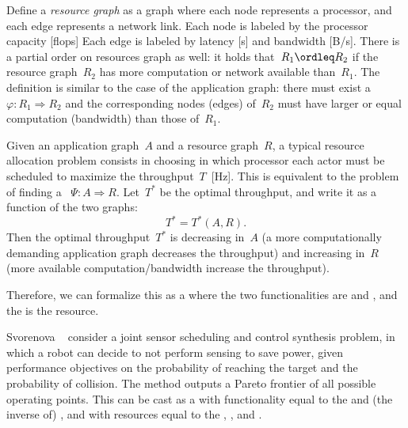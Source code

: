 Define a \emph{resource graph} as a graph where each node represents a processor, and each edge represents a network link.
Each node is labeled by the processor capacity [flops] Each edge is labeled by latency [s] and bandwidth [B/s].
There is a partial order on resources graph as well: it holds that~$R_1 \ordleq R_2$ if the resource graph~$R_2$ has more computation or network available than~$R_1$.
The definition is similar to the case of the application graph: there must exist a ~$\varphi \colon R_1 \Rightarrow R_2$
and the corresponding nodes (edges) of~$R_2$ must have larger or equal computation (bandwidth) than those of~$R_1$.

Given an application graph~$A$ and a resource graph~$R$, a typical resource allocation problem consists in choosing in which processor each actor must be scheduled to maximize the throughput~$T$~[Hz].
This is equivalent to the problem of finding a ~$\Psi \colon A \Rightarrow R$.
Let~$T^{\ast}$ be the optimal throughput, and write it as a function of the two graphs:
\begin{equation}
    T^{\ast}=T^{\ast}(A,R).
\end{equation}
Then the optimal throughput~$T^{\ast}$ is decreasing in~$A$ (a more computationally demanding application graph decreases the throughput) and increasing in~$R$ (more available computation/bandwidth increase the throughput).

Therefore, we can formalize this as a  where the two functionalities are  and , and the  is the resource.

\begin{figure}[h!]
    \centering
    \caption{}
\end{figure}

\begin{example}
    Svorenova\,\,\etal~\cite{svorenova16resource} consider a joint sensor scheduling and control synthesis problem, in which a robot can decide to not perform sensing to save power, given performance objectives on the probability of reaching the target and the probability of collision.
    The method outputs a Pareto frontier of all possible operating points.
    This can be cast as a  with functionality equal to the  and (the inverse of) , and with resources equal to the
    , , and .
\end{example}

